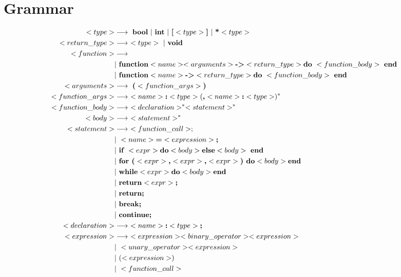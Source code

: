 \documentclass{article}
\begin{document}
\section{Grammar}
\begin{align*}
<type> &\longrightarrow \ \textbf{bool} \ | \ \textbf{int} \ | \ \textbf{[}<type>\textbf{]} \ | \ \textbf{*} <type> \\
<return\_type> &\longrightarrow \ <type> \ | \ \textbf{void} \\
<function>  &\longrightarrow \\ 
    &| \ \textbf{function} <name> <arguments> \textbf{-\textgreater} <return\_type> \textbf{do} \ <function\_body> \ \textbf{end} \\
    &| \ \textbf{function} <name> \textbf{-\textgreater} <return\_type> \textbf{do} \ <function\_body> \ \textbf{end} \\
<arguments> &\longrightarrow \ \textbf{(} <function\_args>\textbf{)} \\
<function\_args> &\longrightarrow \ <name> \textbf{:} <type> (\textbf{,} <name> \textbf{:} <type>)^* \\
<function\_body> &\longrightarrow \ <declaration>^* <statement>^* \\
<body> &\longrightarrow \ <statement>^* \\
<statement> &\longrightarrow \ <function\_call>; \\
    &| \ <name> \textbf{=} <expression> \textbf{;}\\ 
    &| \ \textbf{if } <expr> \textbf{do} <body> \textbf{else} <body>  \ \textbf{end} \\
    &| \ \textbf{for (} <expr> \textbf{,} <expr> \textbf{,} <expr> \textbf{) do} <body> \textbf{end} \\ 
    &| \ \textbf{while} <expr> \textbf{do} <body> \textbf{end} \\
    &| \ \textbf{return} <expr> \textbf{;} \\
    &| \ \textbf{return;} \\
    &| \ \textbf{break;} \\ 
    &| \ \textbf{continue;} \\ 
<declaration>  &\longrightarrow \ <name> \textbf{:} <type> \textbf{;} \\
<expression> &\longrightarrow \ <expression> <binary\_operator> <expression> \\
 &| \ <unary\_operator> <expression> \\
 &| \ ( <expression> ) \\
 &| \ <function\_call> \\

\end{align*}
\end{document}
